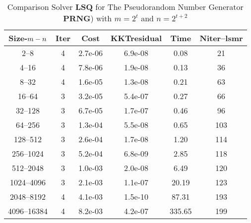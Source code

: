 \begin{table}
\caption{Comparison Solver {\bf LSQ}  for  The Pseudorandom Number Generator {\bf PRNG}) with $m=2^{t}$ and $n=2^{t+2}$}  
\begin{center}
\begin{tabular}{|*{6}{c}|} \hline
Size-$m\--n$ & \multicolumn{1}{c}{Iter} & \multicolumn{1}{c}{Cost}& \multicolumn{1}{c}{KKTresidual} & \multicolumn{1}{c}{Time} & \multicolumn{1}{c|}{Niter--lsmr} \\ 
\hline
2--8           &4    &2.7e-06        &6.9e-08        &0.08           &21   \\ 
4--16          &4    &7.8e-06        &1.9e-08        &0.13           &36   \\ 
8--32          &4    &1.6e-05        &1.3e-08        &0.21           &63   \\ 
16--64         &3    &3.2e-05        &5.4e-07        &0.27           &66   \\ 
32--128        &3    &6.7e-05        &1.7e-07        &0.46           &96   \\ 
64--256        &3    &1.3e-04        &5.5e-08        &0.65           &103  \\ 
128--512       &3    &2.6e-04        &1.7e-08        &1.20           &114  \\ 
256--1024      &3    &5.2e-04        &6.8e-09        &2.85           &118  \\ 
512--2048      &3    &1.0e-03        &2.0e-08        &6.49           &120  \\ 
1024--4096     &3    &2.1e-03        &1.1e-07        &20.19          &123  \\ 
2048--8192     &4    &4.1e-03        &1.5e-10        &87.31          &193  \\ 
4096--16384    &4    &8.2e-03        &4.2e-07        &335.65         &199  \\
\hline
\end{tabular}
\end{center}
\end{table}

